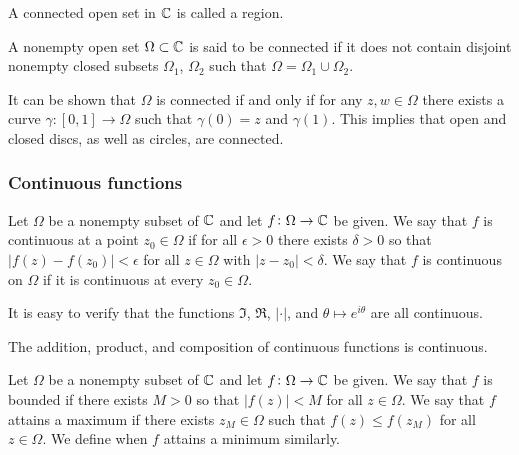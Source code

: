 \documentclass[11pt,a4paper]{article}
\begin{document}
\begin{definition}[Region]
  A connected open set in $\mathbb{C}$ is called a region.
\end{definition}

\begin{definition}
  A nonempty open set $\Omega \subset \mathbb{C}$ is said to be connected if it does
  not contain disjoint nonempty closed subsets $\Omega_1$, $\Omega_2$ such
  that $\Omega = \Omega_1 \cup \Omega_2$.
\end{definition}

\begin{remark}
  It can be shown that $\Omega$ is connected if and only if for any
  $z, w \in \Omega$ there exists a curve $\gamma \colon [0,1] \to \Omega$
  such that $\gamma(0) = z$ and $\gamma(1)$.
  This implies that open and closed discs, as well as circles, are
  connected.
\end{remark}

\subsubsection{Continuous functions}

\begin{definition}
  Let $\Omega$ be a nonempty subset of $\mathbb{C}$ and let 
  $f \colon \Omega \to \mathbb{C}$ be given.
  We say that $f$ is continuous at a point $z_0 \in \Omega$ 
  if for all $\epsilon > 0$ there exists $\delta > 0$ so
  that $|f(z) - f(z_0)| < \epsilon$ for all $z \in \Omega$ with 
  $|z - z_0| < \delta$.
  We say that $f$ is continuous on $\Omega$ if it is continuous at every 
  $z_0 \in \Omega$.
\end{definition}

\begin{remark}
  It is easy to verify that the functions $\Im$, $\Re$, $|\cdot|$, and
  $\theta \mapsto e^{i \theta}$ are all continuous.
\end{remark}

\begin{proposition}
  The addition, product, and composition of continuous functions is continuous.
\end{proposition}

\begin{definition}
  Let $\Omega$ be a nonempty subset of $\mathbb{C}$ and let 
  $f \colon \Omega \to \mathbb{C}$ be given.
  We say that $f$ is bounded if there exists $M > 0$ so that 
  $|f(z)| < M$ for all $z \in \Omega$.
  We say that $f$ attains a maximum if there exists $z_M \in \Omega$
  such that $f(z) \le f(z_M)$ for all $z \in \Omega$.
  We define when $f$ attains a minimum similarly.
\end{definition}
\end{document}
